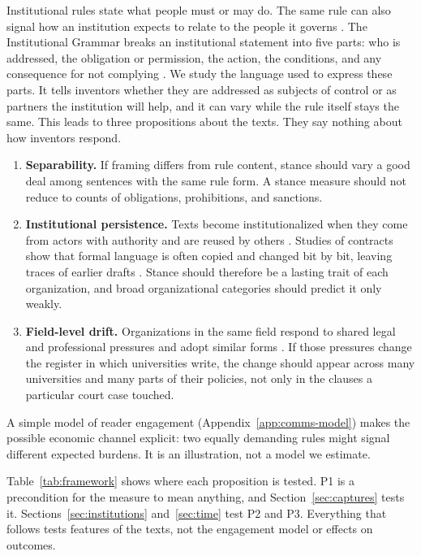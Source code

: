 \documentclass[11pt]{article}
\begin{document}
Institutional rules state what people must or may do. The same rule can also signal how an institution expects to relate to the people it governs \citep{crawford1995grammar,phillips2004discourse}. The Institutional Grammar breaks an institutional statement into five parts: who is addressed, the obligation or permission, the action, the conditions, and any consequence for not complying \citep{crawford1995grammar}. We study the language used to express these parts. It tells inventors whether they are addressed as subjects of control or as partners the institution will help, and it can vary while the rule itself stays the same. This leads to three propositions about the texts. They say nothing about how inventors respond.

\begin{enumerate}[label=\textbf{P\arabic*.},leftmargin=2.2em,itemsep=2pt]
\item \textbf{Separability.} If framing differs from rule content, stance should vary a good deal among sentences with the same rule form. A stance measure should not reduce to counts of obligations, prohibitions, and sanctions.
\item \textbf{Institutional persistence.} Texts become institutionalized when they come from actors with authority and are reused by others \citep{phillips2004discourse}. Studies of contracts show that formal language is often copied and changed bit by bit, leaving traces of earlier drafts \citep{kahan1997standardization,choi2013dynamics}. Stance should therefore be a lasting trait of each organization, and broad organizational categories should predict it only weakly.
\item \textbf{Field-level drift.} Organizations in the same field respond to shared legal and professional pressures and adopt similar forms \citep{dimaggio1983iron,edelman1992legal}. If those pressures change the register in which universities write, the change should appear across many universities and many parts of their policies, not only in the clauses a particular court case touched.
\end{enumerate}

A simple model of reader engagement (Appendix~\ref{app:comms-model}) makes the possible economic channel explicit: two equally demanding rules might signal different expected burdens. It is an illustration, not a model we estimate.

Table~\ref{tab:framework} shows where each proposition is tested. P1 is a precondition for the measure to mean anything, and Section~\ref{sec:captures} tests it. Sections~\ref{sec:institutions} and~\ref{sec:time} test P2 and P3. Everything that follows tests features of the texts, not the engagement model or effects on outcomes.
\end{document}

